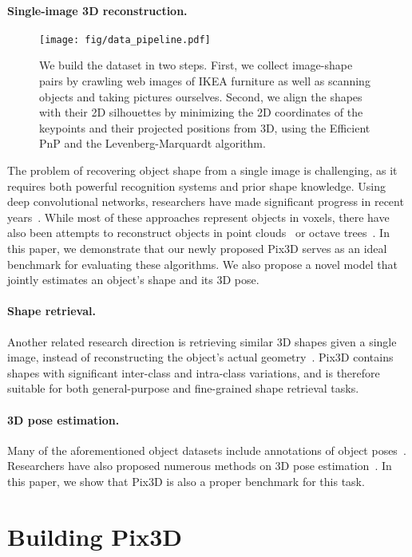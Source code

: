 \documentclass[10pt,twocolumn,letterpaper]{article}
\newcommand{\myparagraph}[1]{\vspace{-14pt}\paragraph{#1}}
\newcommand{\data}{Pix3D\xspace}
\begin{document}
\myparagraph{Single-image 3D reconstruction.}
\begin{figure*}[t]
\centering
\texttt{[image: fig/data\_pipeline.pdf]}
\vspace{-23pt}
\caption{We build the dataset in two steps. First, we collect image-shape pairs by crawling web images of IKEA furniture as well as scanning objects and taking pictures ourselves. Second, we align the shapes with their 2D silhouettes by minimizing the 2D coordinates of the keypoints and their projected positions from 3D, using the Efficient PnP and the Levenberg-Marquardt algorithm.} 
\label{fig:data_pipeline}
\vspace{-15pt}
\end{figure*} 
The problem of recovering object shape from a single image is challenging, as it requires both powerful recognition systems and prior shape knowledge. Using deep convolutional networks, researchers have made significant progress in recent years~\cite{Choy20163d,Girdhar2016Learning,hane2017hierarchical,Kar2015Category,Novotny2017Learning,Rezende2016Unsupervised,Tatarchenko2016Multi,Tulsiani2017Multi,marrnet,Wu2016Learning,Yan2016Perspective,Soltani2017Synthesizing,3dinterpreter}. While most of these approaches represent objects in voxels, there have also been attempts to reconstruct objects in point clouds~\cite{fan2017point} or octave trees~\cite{riegler2017octnet,tatarchenko2017octree}. In this paper, we demonstrate that our newly proposed \data serves as an ideal benchmark for evaluating these algorithms. We also propose a novel model that jointly estimates an object's shape and its 3D pose. 

\myparagraph{Shape retrieval.}

Another related research direction is retrieving similar 3D shapes given a single image, instead of reconstructing the object's actual geometry~\cite{Aubry2014Seeing,Fisher2010Context,gupta2015aligning,savva2016shrec}. \data contains shapes with significant inter-class and intra-class variations, and is therefore suitable for both general-purpose and fine-grained shape retrieval tasks.

\myparagraph{3D pose estimation.}

Many of the aforementioned object datasets include annotations of object poses~\cite{Leibe2003Analyzing,Lim2013Parsing,Savarese20073D,Xiang2016Objectnet3d:,Xiang2014PASCAL:}. Researchers have also proposed numerous methods on 3D pose estimation~\cite{Fidler20123D,ozuysal2009pose,Su2015Render,Tulsiani2015Viewpoints}. In this paper, we show that \data is also a proper benchmark for this task. \section{Building \data}
\label{sec:data}
\end{document}
